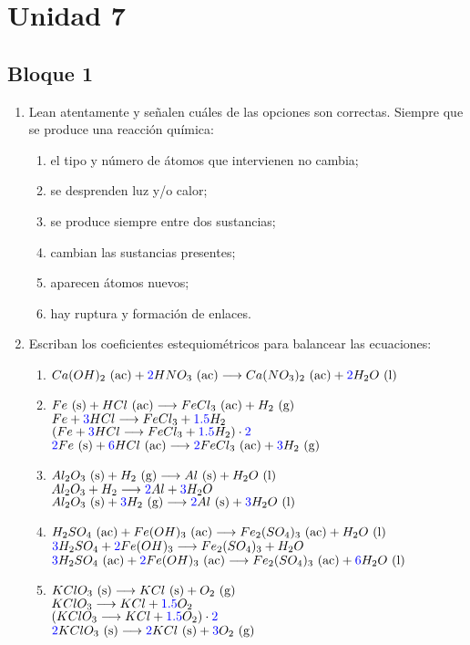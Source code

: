 \documentclass[../practica.root.tex]{subfiles}
\begin{document}
\section{Unidad 7}
\subsection{Bloque 1}
\begin{enumerate}
	\item Lean atentamente y señalen cuáles de las opciones son correctas.
	      Siempre que se produce una reacción química:
	      \begin{enumerate}
		      \item el tipo y número de átomos que intervienen no cambia; \checkmark
		      \item se desprenden luz y/o calor;
		      \item se produce siempre entre dos sustancias;
		      \item cambian las sustancias presentes; \checkmark
		      \item aparecen átomos nuevos;
		      \item hay ruptura y formación de enlaces. \checkmark
	      \end{enumerate}

	\item Escriban los coeficientes estequiométricos para balancear las ecuaciones:
	      \begin{enumerate}
		      \item $Ca(OH)_2 \ \text{(ac)} + \textcolor{blue}{2}HNO_3 \ \text{(ac)} \longrightarrow{} Ca(NO_3)_2 \ \text{(ac)} + \textcolor{blue}{2}H_2O \ \text{(l)}$
		      \item $Fe \ \text{(s)} + HCl \ \text{(ac)} \longrightarrow{} FeCl_3 \ \text{(ac)} + H_2 \ \text{(g)}$ \\
		            $Fe + \textcolor{blue}{3}HCl \longrightarrow{} FeCl_3 + \textcolor{blue}{\num{1,5}}H_2$ \\
		            $(Fe + \textcolor{blue}{3}HCl \longrightarrow{} FeCl_3 + \textcolor{blue}{\num{1,5}}H_2)\cdot\textcolor{blue}{\num{2}}$ \\
		            $\textcolor{blue}{2}Fe \ \text{(s)} + \textcolor{blue}{6}HCl \ \text{(ac)} \longrightarrow{} \textcolor{blue}{2}FeCl_3 \ \text{(ac)} + \textcolor{blue}{3}H_2 \ \text{(g)}$
		      \item $Al_2O_3 \ \text{(s)} + H_2 \ \text{(g)} \longrightarrow{} Al \ \text{(s)} + H_2O \ \text{(l)}$ \\
		            $Al_2O_3 + H_2 \longrightarrow{} \textcolor{blue}{2}Al + \textcolor{blue}{3}H_2O$ \\
		            $Al_2O_3 \ \text{(s)} + \textcolor{blue}{3}H_2 \ \text{(g)} \longrightarrow{} \textcolor{blue}{2}Al \ \text{(s)} + \textcolor{blue}{3}H_2O \ \text{(l)}$
		      \item $H_2SO_4 \ \text{(ac)} + Fe(OH)_3 \ \text{(ac)} \longrightarrow{} Fe_2(SO_4)_3 \ \text{(ac)} + H_2O \ \text{(l)}$ \\
		            $\textcolor{blue}{3}H_2SO_4 + \textcolor{blue}{2}Fe(OH)_3 \longrightarrow{} Fe_2(SO_4)_3 + H_2O$ \\
		            $\textcolor{blue}{3}H_2SO_4 \ \text{(ac)} + \textcolor{blue}{2}Fe(OH)_3 \ \text{(ac)} \longrightarrow{} Fe_2(SO_4)_3 \ \text{(ac)} + \textcolor{blue}{6}H_2O \ \text{(l)}$
		      \item $KClO_3 \ \text{(s)} \longrightarrow{} KCl \ \text{(s)} + O_2 \ \text{(g)}$ \\
		            $KClO_3 \longrightarrow{} KCl + \textcolor{blue}{\num{1,5}}O_2$ \\
		            $(KClO_3 \longrightarrow{} KCl + \textcolor{blue}{\num{1,5}}O_2)\cdot\textcolor{blue}{\num{2}}$ \\
		            $\textcolor{blue}{2}KClO_3 \ \text{(s)} \longrightarrow{} \textcolor{blue}{2}KCl \ \text{(s)} + \textcolor{blue}{3}O_2 \ \text{(g)}$
	      \end{enumerate}


\end{enumerate}
\end{document}

